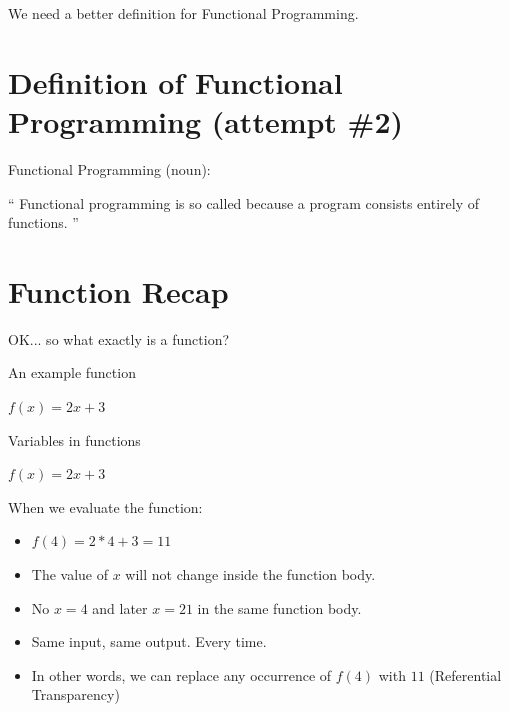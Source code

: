 \documentclass{beamer}
\begin{document}
\begin{frame}{}

  {\Large We need a better definition for Functional Programming.}

\end{frame}

\section{Definition of Functional Programming (attempt \#2)}

\begin{frame}{Functional Programming (noun):}

\begin{exampleblock}{}
  {\Large ``
  Functional programming is so called because a program consists entirely of functions.
  ''}
  \vskip5mm
  \hspace*{}
\end{exampleblock}
\end{frame}

\section{Function Recap}

\begin{frame}{}
OK... so what exactly is a function?
\end{frame}

\begin{frame}{An example function}

  {\Huge $f(x) = 2x + 3$}

\end{frame}

\begin{frame}{Variables in functions}

  {\Huge $f(x) = 2x + 3$}

When we evaluate the function:
  \begin{itemize}[<+->]
    \item $f(4) = 2*4 + 3 = 11$
    \item The value of $x$ will not change inside the function body.
    \item No $x = 4$ and later $x = 21$ in the same function body.
    \item Same input, same output. Every time.
    \item In other words, we can replace any occurrence of $f(4)$ with
      $11$ (Referential Transparency)
  \end{itemize}
\end{frame}
\end{document}
